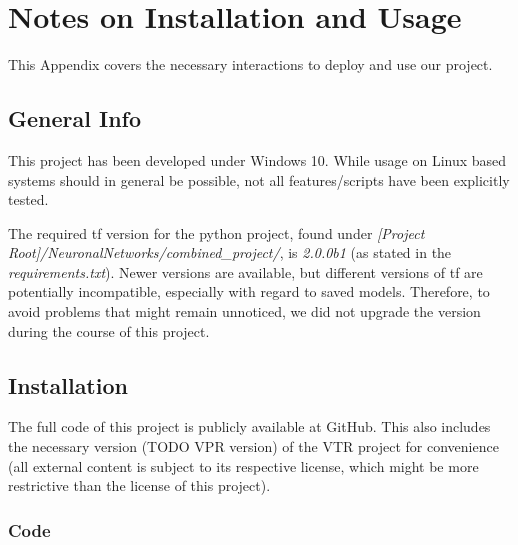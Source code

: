 

\chapter{Notes on Installation and Usage}\label{ch:InstallAndUse}
\glsresetall %

This Appendix covers the necessary interactions to deploy and use our project.

\section{General Info}

This project has been developed under Windows 10. While usage on Linux based systems should in general be possible, not all features/scripts have been explicitly tested.

The required \gls{tf} version for the python project, found under \textit{[Project Root]/NeuronalNetworks/combined\_project/}, is \textit{2.0.0b1} (as stated in the \textit{requirements.txt}). Newer versions are available, but different versions of \gls{tf} are potentially incompatible, especially with regard to saved models. Therefore, to avoid problems that might remain unnoticed, we did not upgrade the version during the course of this project. 

\section{Installation}

The full code of this project is publicly available at GitHub\cite{this-project}. This also includes the necessary version (TODO VPR version) of the \gls{VTR} project for convenience (all external content is subject to its respective license, which might be more restrictive than the license of this project).

\subsection{Code}


